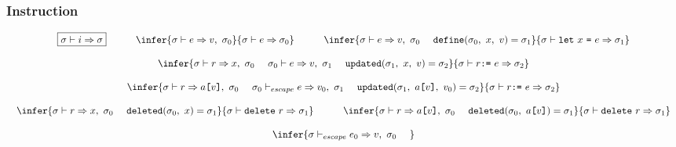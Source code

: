 \newpage

\subsubsection{Instruction}

\[
\begin{array}{c}
\multicolumn{1}{c}{\begin{array}{ccccc}
\fbox{$\evalinst{\symstate}{i}{\symstate}$}
&
\cs
&
\infer
{ \evalexpr{\symstate}{e}{v}{\symstate_0} }
{ \evalinst{\symstate}{e}{\symstate_0} }
&
\cs
&
\infer
{ \evalexpr{\symstate}{e}{v}{\symstate_0}\ \ \ \
\hdefine{\symstate_0}{x}{v}{\symstate_1}}
{ \evalinst{\symstate}{\Term{let}\ x\ \Term{=}\ e}{\symstate_1} }
\end{array}}
\\ \\
\infer
{ \evalref{\symstate}{r}{x}{\symstate_0}\ \ \ \
\evalexpr{\symstate_0}{e}{v}{\symstate_1}\ \ \ \
\hupdated{\symstate_1}{x}{v}{\symstate_2}}
{ \evalinst{\symstate}{r \Term{:=}\ e}{\symstate_2} }
\\ \\
\infer
{ \evalref{\symstate}{r}{a\Term{[} v \Term{]}}{\symstate_0}\ \ \ \
\evalescexpr{\symstate_0}{e}{v_0}{\symstate_1}\ \ \ \
\hupdated{\symstate_1}{a\Term{[} v \Term{]}}{v_0}{\symstate_2}}
{ \evalinst{\symstate}{r \Term{:=}\ e}{\symstate_2} }
\\ \\
\multicolumn{1}{c}{\begin{array}{ccc}
\infer
{ \evalref{\symstate}{r}{x}{\symstate_0}\ \ \ \
\hdeleted{\symstate_0}{x}{\symstate_1}}
{ \evalinst{\symstate}{\Term{delete}\ r}{\symstate_1} }
& \cs &
\infer
{ \evalref{\symstate}{r}{a\Term{[} v \Term{]}}{\symstate_0}\ \ \ \
\hdeleted{\symstate_0}{a\Term{[} v \Term{]}}{\symstate_1}}
{ \evalinst{\symstate}{\Term{delete}\ r}{\symstate_1} }
\end{array}}
\\ \\
\infer
{ \evalescexpr{\symstate}{e_0}{v}{\symstate_0}\ \ \ \
}
\end{array}\]
